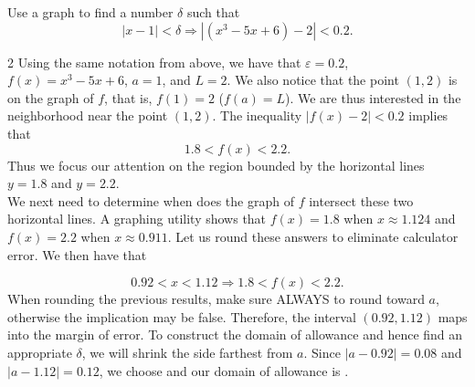 \documentclass{book}
\begin{document}
\begin{Exam} Use a graph to find a number $\delta$ such that 
\[|x-1| < \delta \Longrightarrow |(x^3-5x+6) - 2| < 0.2.\]
\begin{multicols}{2}
Using the same notation from above, we have that $\varepsilon = 0.2$, $f(x) = x^3-5x+6$, $a= 1$, and $L = 2$. We also notice that the point $(1,2)$ is on the graph of $f$, that is, $f(1) = 2$ ($f(a) = L$). We are thus interested in the neighborhood near the point $(1,2)$. The inequality $|f(x) - 2| < 0.2$ implies that \[1.8 < f(x) < 2.2.\] Thus we focus our attention on the region bounded by the horizontal lines $y = 1.8$ and $y = 2.2$. \\

We next need to determine when does the graph of $f$ intersect these two horizontal lines. A graphing utility shows that $f(x) = 1.8$ when $x\approx 1.124$ and $f(x) = 2.2$ when $x\approx 0.911$. Let us round these answers to eliminate calculator error. We then have that \columnbreak

\mbox{}\vspace{15pt}

\mbox{}\hspace{-25pt}
\end{multicols}\vspace{-15pt}


\[0.92 < x < 1.12 \Longrightarrow 1.8 < f(x) < 2.2.\] When rounding the previous results, make sure ALWAYS to round toward $a$, otherwise the implication may be false. Therefore, the interval $(0.92, 1.12)$ maps into the margin of error. To construct the domain of allowance and hence find an appropriate $\delta$, we will shrink the side farthest from $a$. Since $|a-0.92| = 0.08$ and $|a-1.12| = 0.12$, we choose  and our domain of allowance is . 
\end{Exam}\vs
\end{document}
